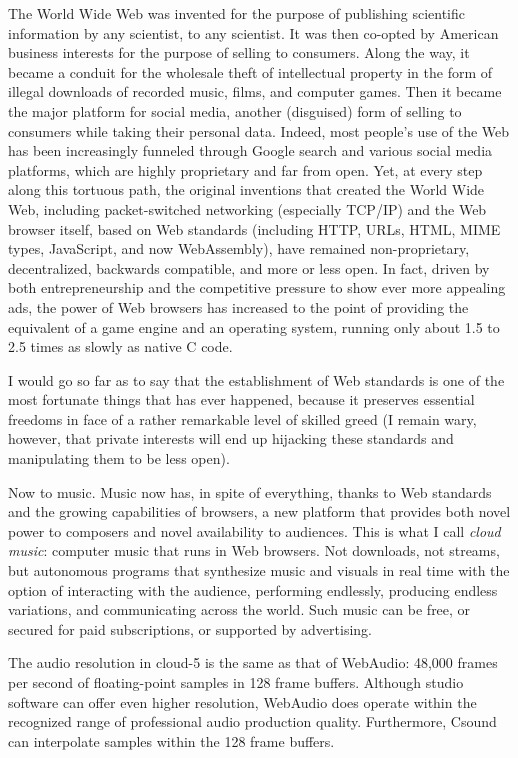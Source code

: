 \documentclass[runningheads,a4paper]{llncs}
\begin{document}
The World Wide Web was invented for the purpose of publishing scientific information by any scientist, to any scientist. It was then co-opted by American business interests for the purpose of selling to consumers. Along the way, it became a conduit for the wholesale theft of intellectual property in the form of illegal downloads of recorded music, films, and computer games. Then it became the major platform for social media, another (disguised) form of selling to consumers while taking their personal data. Indeed, most people's use of the Web has been increasingly funneled through Google search and various social media platforms, which are highly proprietary and far from open. Yet, at every step along this tortuous path, the original inventions that created the World Wide Web, including packet-switched networking (especially TCP/IP) and the Web browser itself, based on  Web standards (including HTTP, URLs, HTML, MIME types, JavaScript, and now WebAssembly), have remained non-proprietary, decentralized, backwards compatible, and more or less open. In fact, driven by both entrepreneurship and the competitive pressure to show ever more appealing ads, the power of Web browsers has increased to the point of providing the equivalent of a game engine and an operating system, running only about 1.5 to 2.5  times as slowly as native C code.

I would go so far as to say that the establishment of Web standards is one of the most fortunate things that has ever happened, because it preserves essential freedoms in face of a rather remarkable level of skilled greed (I remain wary, however, that private interests will end up hijacking these standards and manipulating them to be less open).

Now to music. Music now has, in spite of everything, thanks to Web standards and the growing capabilities of browsers, a new platform that provides both novel power to composers and novel availability to audiences. This is what I call \emph{cloud music}: computer music that runs in Web browsers. Not downloads, not streams, but autonomous programs that synthesize music and visuals in real time with the option of interacting with the audience, performing endlessly, producing endless variations, and communicating across the world. Such music can be free, or secured for paid subscriptions, or supported by advertising. 

The audio resolution in cloud-5 is the same as that of WebAudio: 48,000 frames per second of floating-point samples in 128 frame buffers. Although studio software can offer even higher resolution, WebAudio does operate within the recognized range of professional audio production quality. Furthermore, Csound can interpolate samples within the 128 frame buffers.
\end{document}
